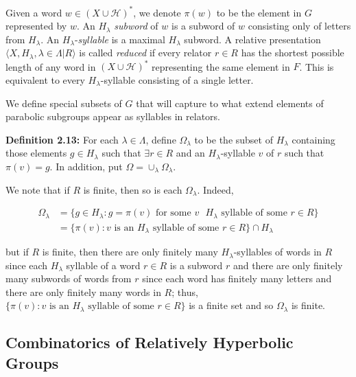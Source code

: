 \documentclass[12pt]{article}
\newcommand{\vs}{\vskip10pt}
\begin{document}
	\vs 
	
	Given a word $w \in (X \cup \mathcal{H})^*$, we denote $\pi(w)$ to be the element in $G$ represented by $w$. An $H_{\lambda}$ \textit{subword} of $w$ is a subword of $w$ consisting only of letters from $H_{\lambda}$. An $H_{\lambda}$-\textit{syllable} is a maximal $H_{\lambda}$ subword. A relative presentation $\langle X, H_{\lambda}, \lambda \in \Lambda \vert R \rangle $ is called \textit{reduced} if every relator $r \in R$ has the shortest possible length of any word in $(X \cup \mathcal{H})^*$ representing the same element in $F$. This is equivalent to every $H_{\lambda}$-syllable consisting of a single letter. 
	
	\vs 
	
	We define special subsets of $G$ that will capture to what extend elements of parabolic subgroups appear as syllables in relators.
	
	\vs 
	
	\textbf{Definition 2.13: } For each $\lambda \in \Lambda$, define $\Omega_{\lambda}$ to be the subset of $H_{\lambda}$ containing those elements $g \in H_{\lambda}$ such that $\exists r \in R$ and an $H_{\lambda}$-syllable $v$ of $r$ such that $\pi(v) = g$. In addition, put $\Omega = \cup_{\lambda} \Omega_{\lambda}$. 
	
	\vs
	
	We note that if $R$ is finite, then so is each $\Omega_{\lambda}$. Indeed,
	
	\vs
		
		\begin{align*}
		\Omega_{\lambda} &= \{g \in H_{\lambda}: g = \pi(v) \text{ for some } v \text{ } H_{\lambda} \text{ syllable of some } r \in R \} \\
		&= \{\pi(v): v \text{ is an } H_{\lambda} \text{ syllable of some } r \in R\} \cap H_{\lambda}
		\end{align*}
		
		but if $R$ is finite, then there are only finitely many $H_{\lambda}$-syllables of words in $R$ since each $H_{\lambda}$ syllable of a word $r \in R$ is a subword $r$ and there are only finitely many subwords of words from $r$ since each word has finitely many letters and there are only finitely many words in $R$; thus, $\{\pi(v): v \text{ is an } H_{\lambda} \text{ syllable of some } r \in R\}$ is a finite set and so $\Omega_{\lambda}$ is finite.
	

	
	\vs 

\newpage
	\subsection{Combinatorics of Relatively Hyperbolic Groups}
	
\end{document}
